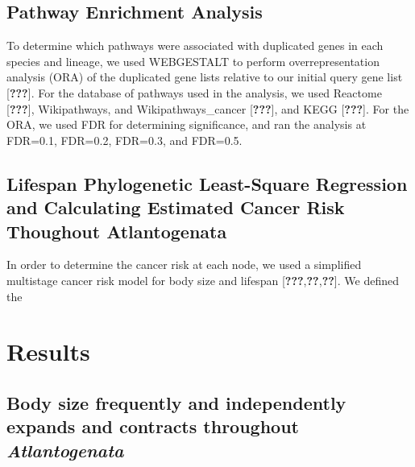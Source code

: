 \documentclass[10pt,letterpaper]{article}
\begin{document}
\hypertarget{pathway-enrichment-analysis}{%
\subsection{Pathway Enrichment
Analysis}\label{pathway-enrichment-analysis}}

To determine which pathways were associated with duplicated genes in
each species and lineage, we used WEBGESTALT to perform
overrepresentation analysis (ORA) of the duplicated gene lists relative
to our initial query gene list {[}{\textbf{???}}{]}. For the database of
pathways used in the analysis, we used Reactome {[}{\textbf{???}}{]},
Wikipathways, and Wikipathways\_cancer {[}{\textbf{???}}{]}, and KEGG
{[}{\textbf{???}}{]}. For the ORA, we used FDR for determining
significance, and ran the analysis at FDR=0.1, FDR=0.2, FDR=0.3, and
FDR=0.5.

\hypertarget{lifespan-phylogenetic-least-square-regression-and-calculating-estimated-cancer-risk-thoughout-atlantogenata}{%
\subsection{Lifespan Phylogenetic Least-Square Regression and
Calculating Estimated Cancer Risk Thoughout
Atlantogenata}\label{lifespan-phylogenetic-least-square-regression-and-calculating-estimated-cancer-risk-thoughout-atlantogenata}}

In order to determine the cancer risk at each node, we used a simplified
multistage cancer risk model for body size and lifespan
{[}{\textbf{???}},{\textbf{??}},{\textbf{??}}{]}. We defined the

\hypertarget{results}{%
\section{Results}\label{results}}

\hypertarget{body-size-frequently-and-independently-expands-and-contracts-throughout-atlantogenata}{%
\subsection{\texorpdfstring{Body size frequently and independently
expands and contracts throughout
\emph{Atlantogenata}}{Body size frequently and independently expands and contracts throughout Atlantogenata}}\label{body-size-frequently-and-independently-expands-and-contracts-throughout-atlantogenata}}
\end{document}
